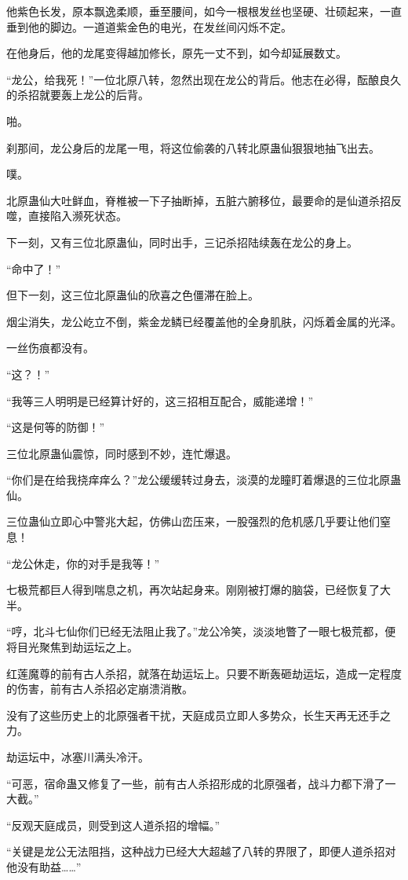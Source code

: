\begin{this_body}
他紫色长发，原本飘逸柔顺，垂至腰间，如今一根根发丝也坚硬、壮硕起来，一直垂到他的脚边。一道道紫金色的电光，在发丝间闪烁不定。

在他身后，他的龙尾变得越加修长，原先一丈不到，如今却延展数丈。

“龙公，给我死！”一位北原八转，忽然出现在龙公的背后。他志在必得，酝酿良久的杀招就要轰上龙公的后背。

啪。

刹那间，龙公身后的龙尾一甩，将这位偷袭的八转北原蛊仙狠狠地抽飞出去。

噗。

北原蛊仙大吐鲜血，脊椎被一下子抽断掉，五脏六腑移位，最要命的是仙道杀招反噬，直接陷入濒死状态。

下一刻，又有三位北原蛊仙，同时出手，三记杀招陆续轰在龙公的身上。

“命中了！”

但下一刻，这三位北原蛊仙的欣喜之色僵滞在脸上。

烟尘消失，龙公屹立不倒，紫金龙鳞已经覆盖他的全身肌肤，闪烁着金属的光泽。

一丝伤痕都没有。

“这？！”

“我等三人明明是已经算计好的，这三招相互配合，威能递增！”

“这是何等的防御！”

三位北原蛊仙震惊，同时感到不妙，连忙爆退。

“你们是在给我挠痒痒么？”龙公缓缓转过身去，淡漠的龙瞳盯着爆退的三位北原蛊仙。

三位蛊仙立即心中警兆大起，仿佛山峦压来，一股强烈的危机感几乎要让他们窒息！

“龙公休走，你的对手是我等！”

七极荒都巨人得到喘息之机，再次站起身来。刚刚被打爆的脑袋，已经恢复了大半。

“哼，北斗七仙你们已经无法阻止我了。”龙公冷笑，淡淡地瞥了一眼七极荒都，便将目光聚焦到劫运坛之上。

红莲魔尊的前有古人杀招，就落在劫运坛上。只要不断轰砸劫运坛，造成一定程度的伤害，前有古人杀招必定崩溃消散。

没有了这些历史上的北原强者干扰，天庭成员立即人多势众，长生天再无还手之力。

劫运坛中，冰塞川满头冷汗。

“可恶，宿命蛊又修复了一些，前有古人杀招形成的北原强者，战斗力都下滑了一大截。”

“反观天庭成员，则受到这人道杀招的增幅。”

“关键是龙公无法阻挡，这种战力已经大大超越了八转的界限了，即便人道杀招对他没有助益……”


\end{this_body}

